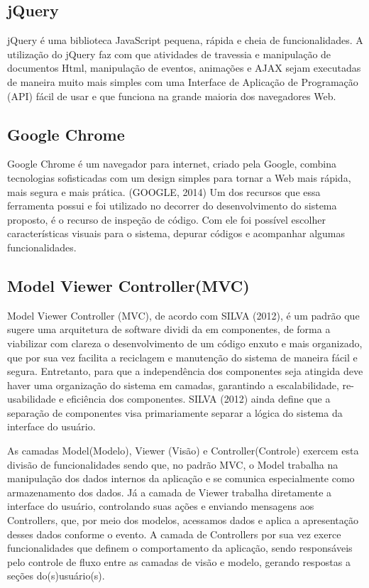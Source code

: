 \documentclass{automatextcc}
\begin{document}
\subsection{jQuery}

jQuery é uma biblioteca JavaScript pequena, rápida e cheia de funcionalidades. A utilização do jQuery faz com que atividades de travessia e manipulação de documentos Html, manipulação de eventos, animações e AJAX sejam executadas de maneira muito mais simples com uma Interface de Aplicação de Programação (API) fácil de usar e que funciona na grande maioria dos navegadores Web. 

\subsection{Google Chrome}

Google Chrome é um navegador para internet, criado pela Google, combina tecnologias sofisticadas com um design simples para tornar a Web mais rápida, mais segura e mais prática. (GOOGLE, 2014) Um dos recursos que essa ferramenta possui e foi utilizado no decorrer do desenvolvimento do sistema proposto, é o recurso de inspeção de código. Com ele foi possível escolher características visuais para o sistema, depurar códigos e acompanhar algumas funcionalidades.

\subsection{Model Viewer Controller(MVC)}

Model Viewer Controller (MVC), de acordo com SILVA (2012), é um padrão que sugere uma arquitetura de software dividi da em componentes, de forma a viabilizar com clareza o desenvolvimento de um código enxuto e mais organizado, que por sua vez facilita a reciclagem e manutenção do sistema de maneira fácil e segura. Entretanto, para que a independência dos componentes seja atingida deve haver uma organização do sistema em  camadas, garantindo a escalabilidade, re-usabilidade e eficiência dos componentes. SILVA (2012) ainda define que a separação de componentes visa primariamente separar  a lógica do sistema da interface do usuário. 

As camadas Model(Modelo), Viewer (Visão) e Controller(Controle) exercem esta divisão de funcionalidades sendo que, no padrão MVC, o Model trabalha na manipulação dos dados internos da aplicação e se comunica especialmente como armazenamento dos dados. Já a camada de Viewer trabalha  diretamente a interface do usuário, controlando suas ações e enviando mensagens aos  Controllers, que, por meio dos modelos, acessamos dados e aplica a apresentação desses  dados conforme o evento. A camada de Controllers por sua vez exerce funcionalidades que definem o comportamento da aplicação, sendo responsáveis pelo controle de fluxo entre  as camadas de visão e modelo, gerando respostas a seções do(s)usuário(s). 
\end{document}
